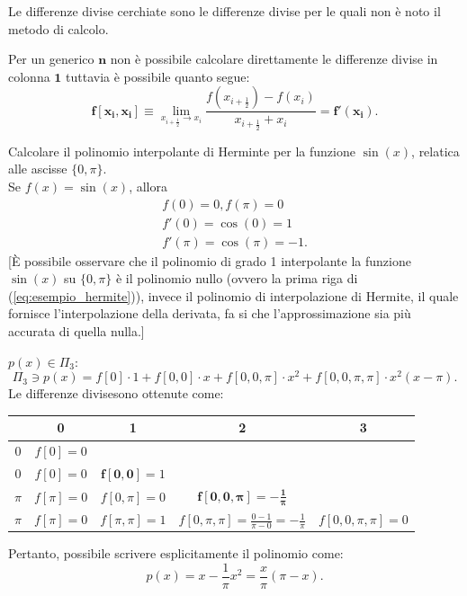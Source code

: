 \begin{example}
    Le differenze divise cerchiate sono le differenze divise per le quali non è noto il metodo di calcolo. 
    
    Per un generico $\boldsymbol n$ non è possibile calcolare direttamente le differenze divise in colonna $\boldsymbol{1}$  tuttavia è possibile quanto segue:
    \begin{equation*}
        \boldsymbol{f[x_i,x_i]}\equiv\lim_{x_{i+\frac{1}{2}}\to x_i}\frac{f\left(x_{i+\frac{1}{2}}\right)-f(x_i)}{x_{i+\frac{1}{2}}+x_i}=\boldsymbol{f'(x_i)}.
    \end{equation*}
\end{example}

\begin{example}
	Calcolare il polinomio interpolante di Herminte per la funzione $\sin(x)$, relatica alle ascisse $\{0, \pi\}$.\\
	Se $f(x)=\sin(x)$, allora
	\begin{equation}\label{eq:esempio_hermite}
		\begin{matrix}
			f(0) = 0, f(\pi) = 0\\
			f'(0) = \cos(0) = 1\\
			f'(\pi) = \cos(\pi) = -1.
		\end{matrix}
	\end{equation}
	[È possibile osservare che il polinomio di grado 1 interpolante la funzione $\sin(x)$ su $\{0,\pi\}$ è il polinomio nullo (ovvero la prima riga di (\ref{eq:esempio_hermite})), invece il polinomio di interpolazione di Hermite, il quale fornisce l'interpolazione della derivata, fa si che l'approssimazione sia più accurata di quella nulla.]
	
	\noindent $p(x)\in\Pi_3$:
	\begin{equation*}
		\Pi_3 \ni p(x) = f[0]\cdot 1 + f[0,0]\cdot x + f[0,0,\pi]\cdot x^2 + f[0,0,\pi, \pi]\cdot x^2 (x-\pi).
	\end{equation*}
	Le differenze divisesono ottenute come:
	\begin{center}
		\begin{tabular}{c|cccc} 
			& 0 & \textbf{1} & 2 & 3 \\
			\hline
			0 & $f[0]=0$ & & &\\
			0 & $f[0]=0$ & $\boldsymbol{f[0, 0]}=1$ & &\\
			$\pi$ & $f[\pi] = 0$ & $f[0,\pi] = 0$ & $\boldsymbol{f[0, 0, \pi] = -\frac{1}{\pi}}$ &\\
			$\pi$ & $f[\pi] = 0$ & $f[\pi, \pi] = 1$ & $f[0,\pi, \pi] = \frac{0-1}{\pi - 0} = -\frac{1}{\pi}$ & $f[0, 0, \pi, \pi] = 0$
		\end{tabular}
	\end{center}
	Pertanto, possibile scrivere esplicitamente il polinomio come:
	\begin{equation*}
		p(x) = x - \frac{1}{\pi} x^2 = \frac{x}{\pi}(\pi - x).
	\end{equation*}
	

\end{example}
